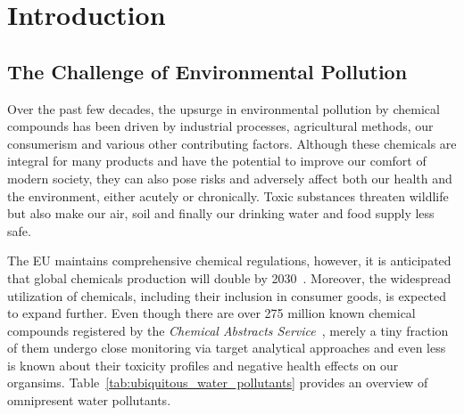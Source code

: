 \chapter{Introduction}\label{chap:introduction}

\section{The Challenge of Environmental Pollution}

Over the past few decades, the upsurge in environmental pollution by chemical compounds has been driven by industrial processes, agricultural methods, our consumerism and various other contributing factors. Although these chemicals are integral for many products and have the potential to improve our comfort of modern society, they can also pose risks and adversely affect both our health and the environment, either acutely or chronically. Toxic substances threaten wildlife but also make our air, soil and finally our drinking water and food supply less safe. 

The EU maintains comprehensive chemical regulations, however, it is anticipated that global chemicals production will double by 2030~\cite{chemicaloutlook}. Moreover, the widespread utilization of chemicals, including their inclusion in consumer goods, is expected to expand further.
Even though there are over 275 million known chemical compounds registered by the \emph{Chemical Abstracts Service}~\cite{CAS}, merely a tiny fraction of them undergo close monitoring via target analytical approaches and even less is known about their toxicity profiles and negative health effects on our organsims. Table~\ref{tab:ubiquitous_water_pollutants} provides an overview of omnipresent water pollutants.

